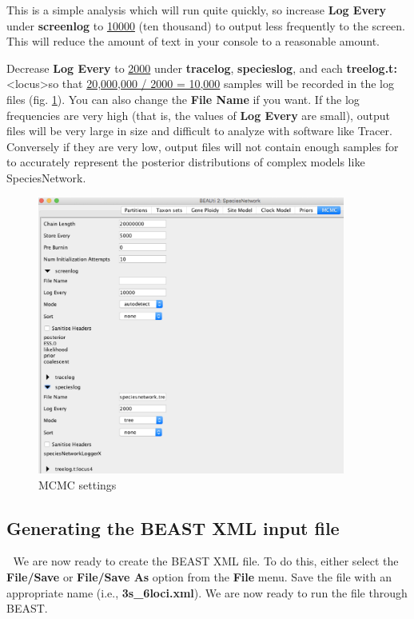 \documentclass[11pt]{article}
\begin{document}
This is a simple analysis which will run quite quickly, so increase \textbf{Log Every} under \textbf{screenlog} to \underline{10000} (ten thousand) to output less frequently to the screen. This will reduce the amount of text in your console to a reasonable amount.

Decrease \textbf{Log Every} to \underline{2000} under \textbf{tracelog}, \textbf{specieslog}, and each \textbf{treelog.t:}\textless{locus}\textgreater so that \underline{20,000,000 / 2000 = 10,000} samples will be recorded in the log files (fig. \ref{fig_mcmc}). You can also change the \textbf{File Name} if you want.
If the log frequencies are very high (that is, the values of \textbf{Log Every} are small), output files will be very large in size and difficult to analyze with software like Tracer. Conversely if they are very low, output files will not contain enough samples for to accurately represent the posterior distributions of complex models like SpeciesNetwork.

\begin{figure}[h]
\center
\includegraphics[width=0.9\textwidth]{figs/fig8_mcmc.png}
\caption{MCMC settings}
\label{fig_mcmc}
\end{figure}

\subsection*{Generating the BEAST XML input file}
We are now ready to create the BEAST XML file. To do this, either select the \textbf{File/Save} or \textbf{File/Save As} option from the \textbf{File} menu. Save the file with an appropriate name (i.e., \textbf{3s\_6loci.xml}). We are now ready to run the file through BEAST.
\end{document}
